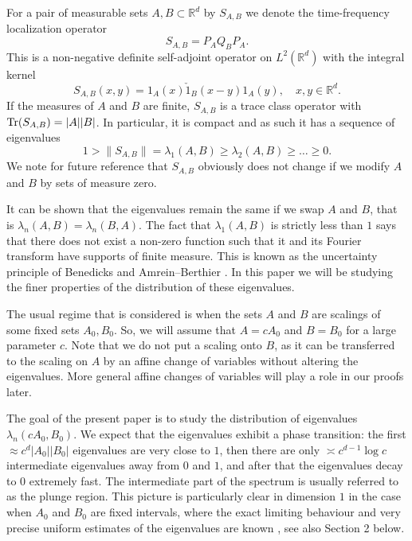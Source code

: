 \documentclass[12pt]{amsart}
\numberwithin{equation}{section}
\newcommand{\R}{\mathbb{R}}
\begin{document}
For a pair of measurable sets $A, B\subset\R^d$ by $S_{A,B}$ we denote the time-frequency localization operator
\[
S_{A,B} = P_AQ_BP_A.
\]
This is a non-negative definite self-adjoint operator on $L^2(\R^d)$ with the integral kernel
\begin{equation}\label{kernel}
S_{A,B}(x,y) = 1_{A}(x) \check{1}_B(x-y) 1_A(y), \quad x,y\in \R^d.
\end{equation}
If the measures of $A$ and $B$ are finite, $S_{A,B}$ is a trace class operator with ${\rm{Tr}}(S_{A,B}) = |A| |B|$. In particular, it is compact and as such it has a sequence of eigenvalues
$$1 > \|S_{A,B}\| =\lambda_1(A,B) \ge \lambda_2(A,B)\ge\ldots \ge 0.$$
We note for future reference that $S_{A,B}$ obviously does not change if we modify $A$ and $B$ by sets of measure zero.

It can be shown that the eigenvalues remain the same if we swap $A$ and $B$, that is $\lambda_n(A,B)=\lambda_n(B,A)$. The fact that $\lambda_1(A,B)$ is strictly less than $1$ says that there does not exist a non-zero function such that it and its Fourier transform have supports of finite measure. This is known as the uncertainty principle of Benedicks and Amrein--Berthier \cites{Amrein_Berthier77,Benedicks85}. In this paper we will be studying the finer properties of the distribution of these eigenvalues.

The usual regime that is considered is when the sets $A$ and $B$ are scalings of some fixed sets $A_0, B_0$. So, we will assume that $A = cA_0$ and $B = B_0$ for a large parameter $c$. Note that we do not put a scaling onto $B$, as it can be transferred to the scaling on $A$ by an affine change of variables without altering the eigenvalues. {More general affine changes of variables will play a role in our proofs later.}

The goal of the present paper is to study the distribution of eigenvalues $\lambda_n(cA_0, B_0)$. We expect that the eigenvalues exhibit a phase transition: the first $\approx c^d|A_0||B_0|$ eigenvalues are very close to $1$, then there are only $\asymp c^{d-1}\log c$ intermediate eigenvalues away from $0$ and $1$, and after that the eigenvalues decay to $0$ extremely fast. The intermediate part of the spectrum is usually referred to as the plunge region. This picture is particularly clear in dimension $1$ in the case when $A_0$ and $B_0$ are fixed intervals, where the exact limiting behaviour and very precise uniform estimates of the eigenvalues are known \cites{Karnik_Romberg_Davenport,widom_landau,kulikov_2026,Bonami_Karoui_17,Fuchs}, see also Section 2 below.
\end{document}
